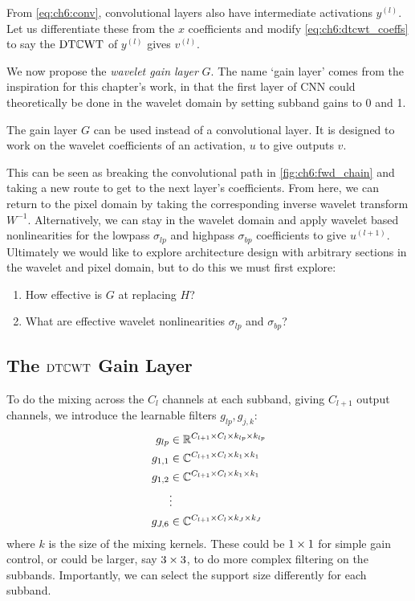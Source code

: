 From \eqref{eq:ch6:conv}, convolutional layers also have intermediate
activations $y^{(l)}$. Let us differentiate these from the $x$ coefficients and
modify \eqref{eq:ch6:dtcwt_coeffs} to say the $\DTCWT$ of $y^{(l)}$ gives
$v^{(l)}$.

We now propose the \emph{wavelet gain layer} $G$.
The name `gain layer' comes from the inspiration for this chapter's work, in
that the first layer of CNN could theoretically be done in the wavelet domain by
setting subband gains to 0 and 1. 

The gain layer $G$ can be used instead of a convolutional layer. 
It is designed to work on the wavelet coefficients of an activation,
$u$ to give outputs $v$. 

This can be seen as breaking the convolutional path in
\autoref{fig:ch6:fwd_chain} and taking a new route to get to the next layer's
coefficients. From here, we can return to the pixel domain by taking the
corresponding inverse wavelet transform $W^{-1}$. Alternatively, we
can stay in the wavelet domain and apply wavelet based nonlinearities
for the lowpass $\sigma_{lp}$ and highpass $\sigma_{bp}$ coefficients
to give $u^{(l+1)}$. Ultimately we would like to explore
architecture design with arbitrary sections in the wavelet and pixel domain, but
to do this we must first explore: 
\begin{enumerate}[itemsep=0pt,parsep=5pt,topsep=0pt]
  \item How effective is $G$ at replacing $H$?
  \item What are effective wavelet nonlinearities $\sigma_{lp}$ and $\sigma_{bp}$?
\end{enumerate}

\subsection{The $\DTCWT$ Gain Layer}
To do the mixing across the $C_l$ channels at each subband, giving $C_{l+1}$
output channels, we introduce the learnable filters $g_{lp}, g_{j,k}$:
%
\begin{align}
  g_{lp} &\in \reals[C_{l+1}\x C_l\x k_{lp}\x k_{lp}] \label{eq:ch6:glp} \\
  g_{1,1} &\in \complexes[C_{l+1}\x C_l\x k_1\x k_1] \\
  g_{1,2} &\in \complexes[C_{l+1}\x C_l\x k_1\x k_1] \\
      & \vdots \nonumber \\
  g_{J,6} &\in \complexes[C_{l+1}\x C_l\x k_J\x k_J]  \label{eq:ch6:gj6}
\end{align}
%
where $k$ is the size of the mixing kernels. These could be $1\x 1$ for
simple gain control, or could be larger, say $3\x 3$, to do more complex
filtering on the subbands. Importantly, we can select the support size
differently for each subband.

